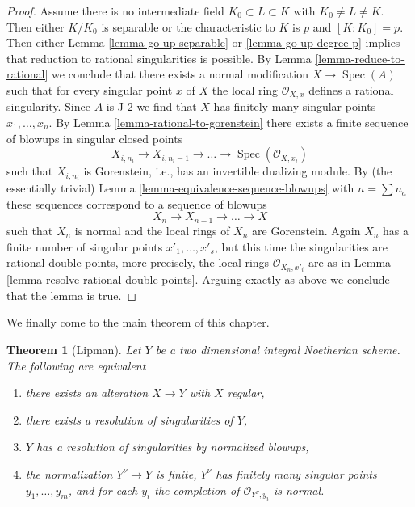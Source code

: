 \documentclass{stacks-project}
\newenvironment{reference}{\comment}{\endcomment}
\theoremstyle{plain}
\newtheorem{theorem}[subsection]{Theorem}
\theoremstyle{definition}
\theoremstyle{remark}
\numberwithin{equation}{subsection}
\def\Spec{\mathop{\mathrm{Spec}}}
\begin{document}
\begin{proof}
\medskip\noindent
Assume there is no intermediate field $K_0 \subset L \subset K$
with $K_0 \not = L \not = K$. Then either $K/K_0$ is separable
or the characteristic to $K$ is $p$ and $[K : K_0] = p$.
Then either Lemma \ref{lemma-go-up-separable} or \ref{lemma-go-up-degree-p}
implies that reduction to rational singularities is possible.
By Lemma \ref{lemma-reduce-to-rational} we conclude that there exists a
normal modification $X \to \Spec(A)$ such that for
every singular point $x$ of $X$ the local ring $\mathcal{O}_{X, x}$
defines a rational singularity. Since $A$ is J-2 we find that $X$ has
finitely many singular points $x_1, \ldots, x_n$.
By Lemma \ref{lemma-rational-to-gorenstein}
there exists a finite sequence of blowups in singular closed points
$$
X_{i, n_i} \to X_{i, n_i - 1} \to \ldots \to \Spec(\mathcal{O}_{X, x_i})
$$
such that $X_{i, n_i}$ is Gorenstein, i.e., has an
invertible dualizing module. By (the essentially trivial)
Lemma \ref{lemma-equivalence-sequence-blowups}
with $n = \sum n_a$ these sequences correspond to a sequence of
blowups
$$
X_n \to X_{n - 1} \to \ldots \to X
$$
such that $X_n$ is normal and the local rings of $X_n$ are Gorenstein.
Again $X_n$ has a finite number of singular points
$x'_1, \ldots, x'_s$, but this time the singularities are
rational double points, more precisely, the local rings
$\mathcal{O}_{X_n, x'_i}$ are as in
Lemma \ref{lemma-resolve-rational-double-points}.
Arguing exactly as above we conclude that the lemma is true.
\end{proof}

\noindent
We finally come to the main theorem of this chapter.

\begin{theorem}[Lipman]
\label{theorem-resolve}
\begin{reference}
\cite[Theorem on page 151]{Lipman}
\end{reference}
Let $Y$ be a two dimensional integral Noetherian scheme. The following are
equivalent
\begin{enumerate}
\item there exists an alteration $X \to Y$ with $X$ regular,
\item there exists a resolution of singularities of $Y$,
\item $Y$ has a resolution of singularities by normalized blowups,
\item the normalization $Y^\nu \to Y$ is finite, $Y^\nu$ has
finitely many singular points $y_1, \ldots, y_m$, and for each
$y_i$ the completion of $\mathcal{O}_{Y^\nu, y_i}$ is normal.
\end{enumerate}
\end{theorem}
\end{document}
